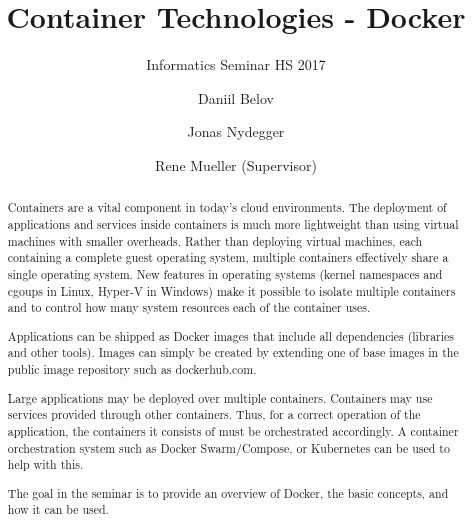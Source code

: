 \documentclass[sigconf]{acmart}
\begin{document}
\title{Container Technologies - Docker}
\subtitle{Informatics Seminar HS 2017}

\author{Daniil Belov}

\author{Jonas Nydegger}

\author{Rene Mueller (Supervisor)}

\begin{abstract}
	Containers are a vital component in today’s cloud environments. The deployment of applications and services inside containers is much more lightweight than using virtual machines with smaller overheads. Rather than deploying virtual machines, each containing a complete guest operating system, multiple containers effectively share a single operating system. New features in operating systems (kernel namespaces and cgoups in Linux, Hyper-V in Windows) make it possible to isolate multiple containers and to control how many system resources each of the container uses.

Applications can be shipped as Docker images that include all dependencies (libraries and other tools). Images can simply be created by extending one of base images in the public image repository such as dockerhub.com.

Large applications may be deployed over multiple containers. Containers may use services provided through other containers. Thus, for a correct operation of the application, the containers it consists of must be orchestrated accordingly. A container orchestration system such as Docker Swarm/Compose, or Kubernetes can be used to help with this.

The goal in the seminar is to provide an overview of Docker, the basic concepts, and how it can be used.
\end{abstract}
\end{document}
